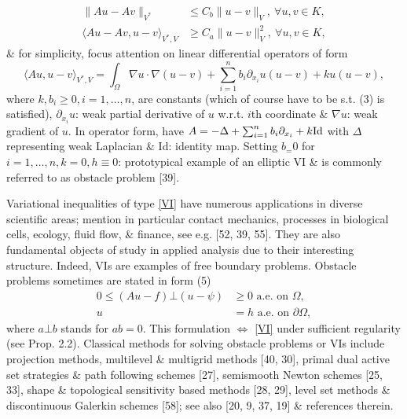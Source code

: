 \documentclass{article}
\begin{document}
\begin{enumerate}
\begin{itemize}
\begin{align}
			\|Au - Av\|_{V^*}&\le C_b\|u - v\|_V,\ \forall u,v\in K,\\
			\langle Au - Av,u - v\rangle_{V^*,V}&\ge C_a\|u - v\|_V^2,\ \forall u,v\in K,
		\end{align}
		\& for simplicity, focus attention on linear differential operators of form
		\begin{equation}
			\langle Au,u - v\rangle_{V^*,V} = \int_\Omega \nabla u\cdot\nabla(u - v) + \sum_{i=1}^n b_i\partial_{x_i}u(u - v) + ku(u - v),
		\end{equation}
		where $k,b_i\ge0,i = 1,\ldots,n$, are constants (which of course have to be s.t. (3) is satisfied), $\partial_{x_i}u$: weak partial derivative of $u$ w.r.t. $i$th coordinate \& $\nabla u$: weak gradient of $u$. In operator form, have $A = -\Delta + \sum_{i=1}^n b_i\partial_{x_i} + k{\rm Id}$ with $\Delta$ representing weak Laplacian \& Id: identity map. Setting $b_ = 0$ for $i = 1,\ldots,n,k = 0,h\equiv0$: prototypical example of an elliptic VI \& is commonly referred to as obstacle problem [39].
		
		Variational inequalities of type \eqref{VI} have numerous applications in diverse scientific areas; mention in particular contact mechanics, processes in biological cells, ecology, fluid flow, \& finance, see e.g. [52, 39, 55]. They are also fundamental objects of study in applied analysis due to their interesting structure. Indeed, VIs are examples of free boundary problems. Obstacle problems sometimes are stated in form (5)
		\begin{align}
			0\le(Au - f)\bot(u - \psi)&\ge0\mbox{ a.e. on }\Omega,\\
			u &= h\mbox{ a.e. on }\partial\Omega,
		\end{align}
		where $a\bot b$ stands for $ab = 0$. This formulation $\Leftrightarrow$ \eqref{VI} under sufficient regularity (see Prop. 2.2). Classical methods for solving obstacle problems or VIs include projection methods, multilevel \& multigrid methods [40, 30], primal dual active set strategies \& path following schemes [27], semismooth Newton schemes [25, 33], shape \& topological sensitivity based methods [28, 29], level set methods \& discontinuous Galerkin schemes [58]; see also [20, 9, 37, 19] \& references therein.
		

\end{itemize}
\end{enumerate}
\end{document}
